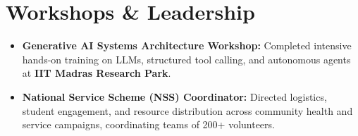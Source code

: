 \documentclass[letterpaper,10pt]{article}
\newcommand{\resumeItem}[1]{
  \item\small{
    {#1 \vspace{-2pt}}
  }
}
\newcommand{\resumeSubHeadingListStart}{\begin{itemize}[leftmargin=0.0in, label={}]}
\newcommand{\resumeSubHeadingListEnd}{\end{itemize}}
\newcommand{\resumeItemListStart}{\begin{itemize}[leftmargin=0.15in, label=\raisebox{0.15ex}{\tiny$\bullet$}, itemsep=1.5pt]}
\newcommand{\resumeItemListEnd}{\end{itemize}\vspace{-3pt}}
\begin{document}
\section{Workshops \& Leadership}
    \resumeSubHeadingListStart
        \resumeItemListStart
            \resumeItem{\textbf{Generative AI Systems Architecture Workshop:} Completed intensive hands-on training on LLMs, structured tool calling, and autonomous agents at \textbf{IIT Madras Research Park}.}
            \resumeItem{\textbf{National Service Scheme (NSS) Coordinator:} Directed logistics, student engagement, and resource distribution across community health and service campaigns, coordinating teams of 200+ volunteers.}
        \resumeItemListEnd
    \resumeSubHeadingListEnd
\end{document}
